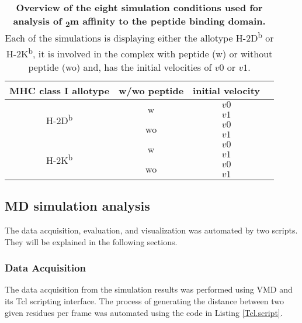 \documentclass[11pt,twocolumn]{article}
\newcommand{\db}{H-2D\textsuperscript{b}\xspace}
\newcommand{\kb}{H-2K\textsuperscript{b}\xspace}
\newcommand{\btm}{\textbeta\textsubscript{2}m\xspace}
\begin{document}
\begin{table}[H]
\caption{\textbf{Overview of the eight simulation conditions used for analysis of \btm affinity to the peptide binding domain.} Each of the simulations is displaying either the allotype \db or \kb, it is involved in the complex with peptide (w) or without peptide (wo) and, has the initial velocities of $v0$ or $v1$.}
\label{simulations}
\centering 
\resizebox{0.4\textwidth}{!} {
\begin{tabular}{|c|c|c|c|}  \hline
MHC class I allotype& w/wo peptide&initial velocity\\ \hline
\multirow{4}{*}{\db}&\multirow{2}{*}{w}&$v0$\\
\cline{3-3} 
&&$v1$\\
\cline{2-3} 
&\multirow{2}{*}{wo}&$v0$\\
\cline{3-3} 
&&$v1$\\
\hline
\multirow{4}{*}{\kb}&\multirow{2}{*}{w}&$v0$\\
\cline{3-3} 
&&$v1$\\
\cline{2-3} 
&\multirow{2}{*}{wo}&$v0$\\
\cline{3-3} 
&&$v1$\\
\hline

\end{tabular}
}
\end{table}

\subsection*{MD simulation analysis}

The data acquisition, evaluation, and visualization was automated by two scripts. They will be explained in the following  sections.

\subsubsection*{Data Acquisition}

The data acquisition from  the simulation results was performed using VMD and its Tcl scripting interface. The process of generating the distance between two given residues per frame was automated using the code in Listing \ref{Tcl.script}.
\end{document}

